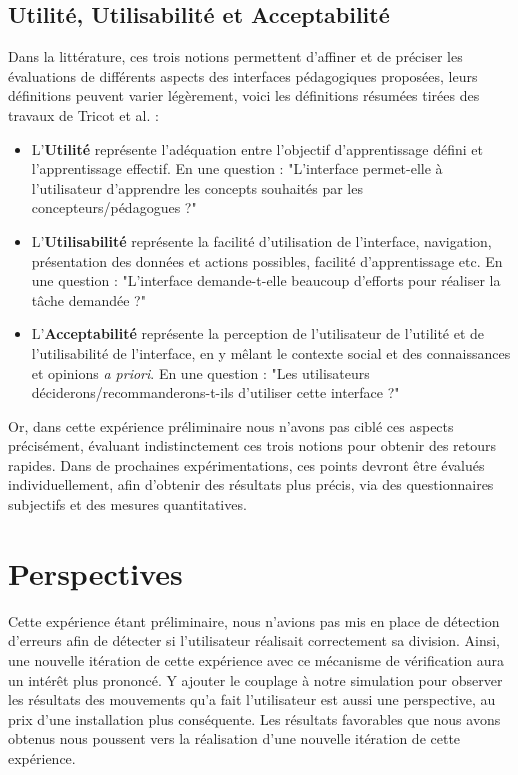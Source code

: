 	 
		
		\subsection{Utilité, Utilisabilité et Acceptabilité}
		Dans la littérature, ces trois notions permettent d'affiner et de préciser les évaluations de différents aspects des interfaces pédagogiques proposées, leurs définitions peuvent varier légèrement, voici les définitions résumées tirées des travaux de Tricot et al. \cite{tricot_utilite_2003} :
		\begin{itemize}
			\item L'\textbf{Utilité} représente l'adéquation entre l'objectif d'apprentissage défini et l'apprentissage effectif. En une question : "L'interface permet-elle à l'utilisateur d'apprendre les concepts souhaités par les concepteurs/pédagogues ?"
			\item L'\textbf{Utilisabilité} représente la facilité d'utilisation de l'interface, navigation, présentation des données et actions possibles, facilité d'apprentissage etc. En une question : "L'interface demande-t-elle beaucoup d'efforts pour réaliser la tâche demandée ?"
			\item L'\textbf{Acceptabilité} représente la perception de l'utilisateur de l'utilité et de l'utilisabilité de l'interface, en y mêlant le contexte social et des connaissances et opinions \textit{a priori}. En une question : "Les utilisateurs déciderons/recommanderons-t-ils d'utiliser cette interface ?"
		\end{itemize}
		
		Or, dans cette expérience préliminaire nous n'avons pas ciblé ces aspects précisément, évaluant indistinctement ces trois notions pour obtenir des retours rapides. Dans de prochaines expérimentations, ces points devront être évalués individuellement, afin d'obtenir des résultats plus précis, via des questionnaires subjectifs et des mesures quantitatives.
	
	\section{Perspectives}
 	Cette expérience étant préliminaire, nous n'avions pas mis en place de détection d'erreurs afin de détecter si l'utilisateur réalisait correctement sa division. Ainsi, une nouvelle itération de cette expérience avec ce mécanisme de vérification aura un intérêt plus prononcé. Y ajouter le couplage à notre simulation pour observer les résultats des mouvements qu'a fait l'utilisateur est aussi une perspective, au prix d'une installation plus conséquente. Les résultats favorables que nous avons obtenus nous poussent vers la réalisation d'une nouvelle itération de cette expérience.
	
